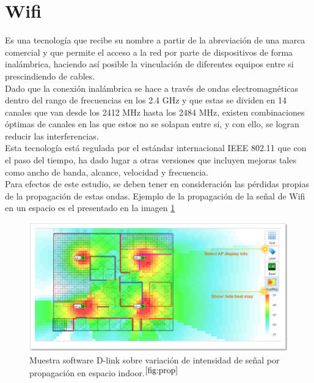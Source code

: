 \section{Wifi}

Es una tecnología que recibe su nombre a partir de la abreviación de una marca comercial y que permite el acceso a la red por parte de dispositivos de forma inalámbrica, haciendo así posible  la vinculación de diferentes equipos entre si prescindiendo de cables.\\

Dado que la conexión inalámbrica se hace a través de ondas electromagnéticas dentro del rango de frecuencias en los 2.4 GHz y que estas se dividen en 14 canales que van desde los 2412 MHz hasta los 2484 MHz, existen combinaciones óptimas de canales en las que estos no se solapan entre si, y con ello, se logran reducir las interferencias.\\

Esta tecnología está regulada por el estándar internacional IEEE 802.11 que con el paso del tiempo, ha dado lugar a otras versiones que incluyen mejoras tales como ancho de banda, alcance, velocidad y frecuencia.\\

Para efectos de este estudio, se deben tener en consideración las pérdidas propias de la propagación de estas ondas. Ejemplo de la propagación de la señal de Wifi en un espacio es el presentado en la imagen \ref{fig:propagacion} \\

\begin{figure}[h!]
\centering
\includegraphics[scale=0.8]{./imagenes/propagacion}
\caption{Muestra software D-link sobre variación de intensidad de señal por propagación en espacio indoor.$^{\ref{fig:prop}}$}
\label{fig:propagacion}
\end{figure}

